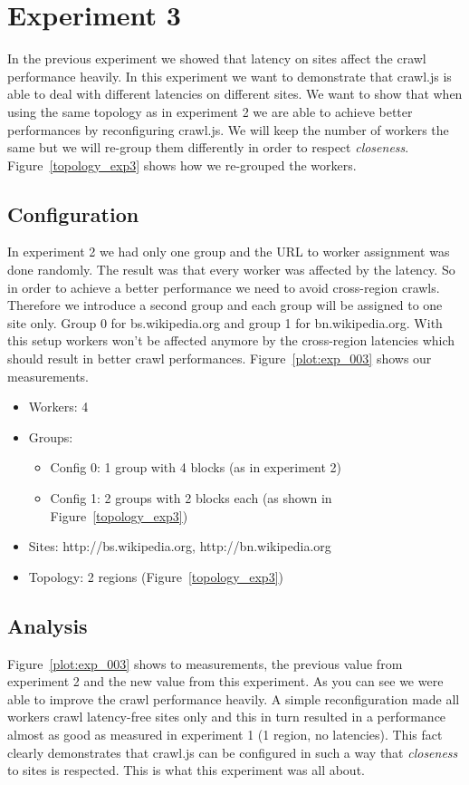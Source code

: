 \section{Experiment 3}

In the previous experiment we showed that latency on sites affect the crawl performance heavily. In this experiment we want to demonstrate that crawl.js is able to deal with different latencies on different sites. We want to show that when using the same topology as in experiment 2 we are able to achieve better performances by reconfiguring crawl.js. We will keep the number of workers the same but we will re-group them differently in order to respect \emph{closeness}. Figure~\ref{topology_exp3} shows how we re-grouped the workers. 

\subsection{Configuration}
In experiment 2 we had only one group and the URL to worker assignment was done randomly. The result was that every worker was affected by the latency. So in order to achieve a better performance we need to avoid cross-region crawls. Therefore we introduce a second group and each group will be assigned to one site only. Group 0 for bs.wikipedia.org and group 1 for bn.wikipedia.org. With this setup workers won't be affected anymore by the cross-region latencies which should result in better crawl performances. Figure~\ref{plot:exp_003} shows our measurements.
\begin{itemize}
  \item Workers: 4
  \item Groups:
    \begin{itemize}
      \item Config 0: 1 group with 4 blocks (as in experiment 2)
      \item Config 1: 2 groups with 2 blocks each (as shown in Figure~\ref{topology_exp3})
    \end{itemize}
  \item Sites: http://bs.wikipedia.org, http://bn.wikipedia.org
  \item Topology: 2 regions (Figure~\ref{topology_exp3})
\end{itemize}

\subsection{Analysis}

Figure~\ref{plot:exp_003} shows to measurements, the previous value from experiment 2 and the new value from this experiment. As you can see we were able to improve the crawl performance heavily. A simple reconfiguration made all workers crawl latency-free sites only and this in turn resulted in a performance almost as good as measured in experiment 1 (1 region, no latencies). This fact clearly demonstrates that crawl.js can be configured in such a way that \emph{closeness} to sites is respected. This is what this experiment was all about.

